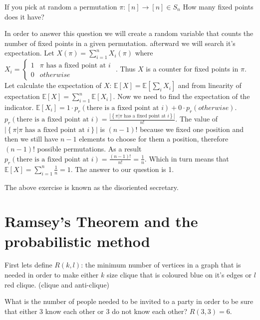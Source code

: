 \begin{xca}
If you pick at random a permutation $\pi:\left[n\right]\to\left[n\right]\in S_{n}$
How many fixed points does it have?

In order to answer this question we will create a random variable
that counts the number of fixed points in a given permutation. afterward
we will search it's expectation. Let $X\left(\pi\right)=\sum\limits _{i=1}^{n}X_{i}\left(\pi\right)$
where $X_{i}=\begin{cases}
1 & \pi\text{ has a fixed point at }i\\
0 & otherwise
\end{cases}$ . Thus $X$ is a counter for fixed points in $\pi$. Let calculate
the expectation of $X$: $\mathbb{E}\left[X\right]=\mathbb{E}\left[\sum_{i}X_{i}\right]$
and from linearity of expectation $\mathbb{E}\left[X\right]=\sum\limits _{i=1}^{n}\mathbb{E}\left[X_{i}\right]$.
Now we need to find the expectation of the indicator. $\mathbb{E}\left[X_{i}\right]=1\cdot p_{r}\left(\text{there is a fixed point at }i\right)+0\cdot p_{r}\left(otherwise\right)$.
$p_{r}\left(\text{there is a fixed point at }i\right)=\frac{\left|\left\{ \pi|\pi\text{ has a fixed point at }i\right\} \right|}{n!}.$
The value of $\left|\left\{ \pi|\pi\text{ has a fixed point at }i\right\} \right|$
is $\left(n-1\right)!$ because we fixed one position and then we
still have $n-1$ elements to choose for them a position, therefore
$\left(n-1\right)!$ possible permutations. As a result $p_{r}\left(\text{there is a fixed point at }i\right)=\frac{\left(n-1\right)!}{n!}=\frac{1}{n}$.
Which in turn means that $\mathbb{E}\left[X\right]=\sum\limits _{i=1}^{n}\frac{1}{n}=1$.
The answer to our question is 1.
\end{xca}

\begin{remark}
The above exercise is known as the disoriented secretary.
\end{remark}


\section{Ramsey's Theorem and the probabilistic method}

First lets define $R\left(k,l\right)$: the minimum number of vertices
in a graph that is needed in order to make either $k$ size clique
that is coloured blue on it's edges or $l$ red clique. (clique and
anti-clique)
\begin{example}
What is the number of people needed to be invited to a party in order
to be sure that either 3 know each other or 3 do not know each other?
$R\left(3,3\right)=6$.
\end{example}

